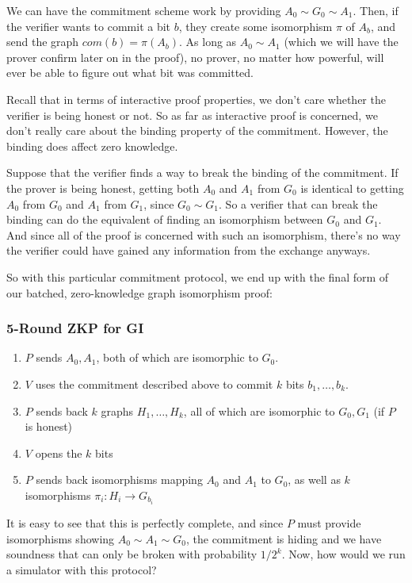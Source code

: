 \documentclass[11pt]{article}
\begin{document}
We can have the commitment scheme work by providing \(A_0\sim G_0\sim A_1\). Then, if the verifier wants to commit a bit \(b\), they create some isomorphism \(\pi\) of \(A_b\), and send the graph \(com(b) = \pi(A_b)\). As long as \(A_0\sim A_1\) (which we will have the prover confirm later on in the proof), no prover, no matter how powerful, will ever be able to figure out what bit was committed.\smallskip

Recall that in terms of interactive proof properties, we don't care whether the verifier is being honest or not. So as far as interactive proof is concerned, we don't really care about the binding property of the commitment. However, the binding does affect zero knowledge. \smallskip

Suppose that the verifier finds a way to break the binding of the commitment. If the prover is being honest, getting both \(A_0\) and \(A_1\) from \(G_0\) is identical to getting \(A_0\) from \(G_0\) and \(A_1\) from \(G_1\), since \(G_0\sim G_1\). So a verifier that can break the binding can do the equivalent of finding an isomorphism between \(G_0\) and \(G_1\). And since all of the proof is concerned with such an isomorphism, there's no way the verifier could have gained any information from the exchange anyways.\medskip

So with this particular commitment protocol, we end up with the final form of our batched, zero-knowledge graph isomorphism proof:

\newpage
\subsubsection{5-Round ZKP for GI}
\begin{enumerate}
\item \(P\) sends \(A_0,A_1\), both of which are isomorphic to \(G_0\).
\item \(V\) uses the commitment described above to commit \(k\) bits \(b_1,\ldots,b_k\).
\item \(P\) sends back \(k\) graphs \(H_1,\ldots, H_k\), all of which are isomorphic to \(G_0,G_1\) (if \(P\) is honest)
\item \(V\) opens the \(k\) bits
\item \(P\) sends back isomorphisms mapping \(A_0\) and \(A_1\) to \(G_0\), as well as \(k\) isomorphisms \(\pi_i:H_i\to G_{b_i}\)
\end{enumerate}

It is easy to see that this is perfectly complete, and since \(P\) must provide isomorphisms showing \(A_0\sim A_1\sim G_0\), the commitment is hiding and we have soundness that can only be broken with probability \(1/2^k\). Now, how would we run a simulator with this protocol?\bigskip
\end{document}
